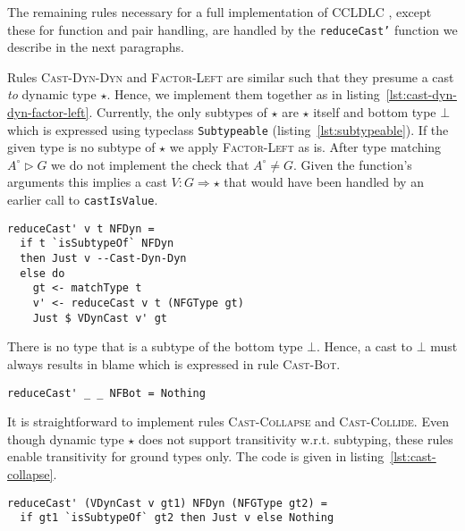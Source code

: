 The remaining rules necessary for a full implementation of CCLDLC , except these for function and pair handling, are handled by the \texttt{reduceCast'} function we describe in the next paragraphs.

Rules \textsc{Cast-Dyn-Dyn} and \textsc{Factor-Left} are similar such that they presume a cast \emph{to} dynamic type $\star$. Hence, we implement them together as in listing~\ref{lst:cast-dyn-dyn-factor-left}. Currently, the only subtypes of $\star$ are $\star$ itself and bottom type $\bot$ which is expressed using typeclass \texttt{Subtypeable} (listing~\ref{lst:subtypeable}). If the given type is no subtype of $\star$ we apply \textsc{Factor-Left} as is. After type matching $A^\circ \rhd G$ we do not implement the check that $A^\circ \neq G$. Given the function's arguments this implies a cast $V : G \Rightarrow \star$ that would have been handled by an earlier call to \texttt{castIsValue}.

\begin{lstlisting}[float,
  label=lst:cast-dyn-dyn-factor-left,
  caption=Rules \textsc{Cast-Dyn-Dyn} and \textsc{Factor-Left} (\texttt{Interpreter.hs})]
reduceCast' v t NFDyn =
  if t `isSubtypeOf` NFDyn
  then Just v --Cast-Dyn-Dyn
  else do
    gt <- matchType t
    v' <- reduceCast v t (NFGType gt)
    Just $ VDynCast v' gt
\end{lstlisting}

There is no type that is a subtype of the bottom type $\bot$. Hence, a cast to $\bot$ must always results in blame which is expressed in rule \textsc{Cast-Bot}.

\begin{lstlisting}[caption=Rule \textsc{Cast-Bot} (\texttt{Interpreter.hs})]
reduceCast' _ _ NFBot = Nothing
\end{lstlisting}

It is straightforward to implement rules \textsc{Cast-Collapse} and \textsc{Cast-Collide}. Even though dynamic type $\star$ does not support transitivity w.r.t. subtyping, these rules enable transitivity for ground types only. The code is given in listing~\ref{lst:cast-collapse}.

\begin{lstlisting}[float,
  caption=Rules \textsc{Cast-Collapse} and \textsc{Cast-Collide} (\texttt{Interpreter.hs}),
  label=lst:cast-collapse]
reduceCast' (VDynCast v gt1) NFDyn (NFGType gt2) =
  if gt1 `isSubtypeOf` gt2 then Just v else Nothing
\end{lstlisting}

